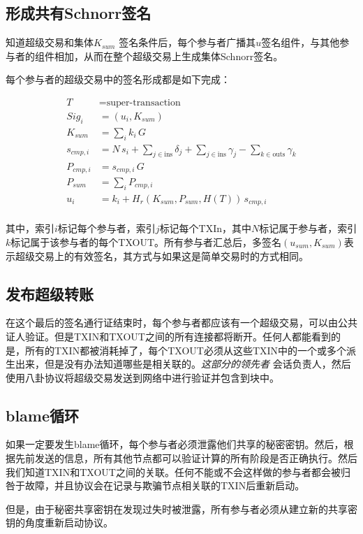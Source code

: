 \documentclass[8pt,fleqn,openany]{book}
\begin{document}
\begin{CJK*}{UTF8}{gbsn}
{\subsection{形成共有Schnorr签名} 
知道超级交易和集体$K_{sum}$ 签名条件后，每个参与者广播其$u$签名组件，与其他参与者的组件相加，从而在整个超级交易上生成集体Schnorr签名。

每个参与者的超级交易中的签名形成都是如下完成：

\begin{align*}
T &= \text{super-transaction} \\
Sig_i &= (u_i, K_{sum}) \\
K_{sum} &= \sum_i{k_i \, G} \\
s_{cmp,i} &= N \, s_i + \sum_{j \in \text{ins}} {\delta_j} + \sum_{j \in \text{ins}} {\gamma_j} - \sum_{k \in \text{outs}} {\gamma_k} \\
P_{cmp,i} &= s_{cmp,i} \, G \\
P_{sum} &= \sum_i{P_{cmp,i}}\\
u_i &= k_i + H_r(K_{sum} , P_{sum},  H(T)) \,  s_{cmp,i}\\
\end{align*}

其中，索引$i$标记每个参与者，索引$j$标记每个TXIn，其中$N$标记属于参与者，索引$k$标记属于该参与者的每个TXOUT。所有参与者汇总后，多签名$(u_{sum}, K_{sum})$表示超级交易上的有效签名，其方式与如果这是简单交易时的方式相同。

\subsection{发布超级转账} 
在这个最后的签名通行证结束时，每个参与者都应该有一个超级交易，可以由公共证人验证。但是TXIN和TXOUT之间的所有连接都将断开。任何人都能看到的是，所有的TXIN都被消耗掉了，每个TXOUT必须从这些TXIN中的一个或多个派生出来，但是没有办法知道哪些是相关联的。\textit{这部分的领先者} 会话负责人，然后使用八卦协议将超级交易发送到网络中进行验证并包含到块中。

\subsection{blame循环} 
如果一定要发生blame循环，每个参与者必须泄露他们共享的秘密密钥。然后，根据先前发送的信息，所有其他节点都可以验证计算的所有阶段是否正确执行。然后我们知道TXIN和TXOUT之间的关联。任何不能或不会这样做的参与者都会被归咎于故障，并且协议会在记录与欺骗节点相关联的TXIN后重新启动。

但是，由于秘密共享密钥在发现过失时被泄露，所有参与者必须从建立新的共享密钥的角度重新启动协议。

}
\end{CJK*}
\end{document}
